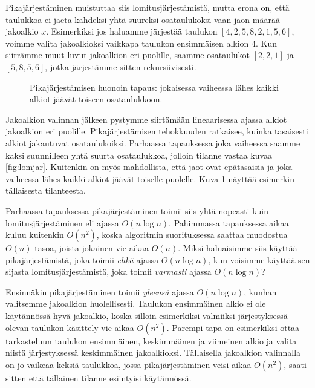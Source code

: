 Pikajärjestäminen muistuttaa siis lomitusjärjestämistä,
mutta erona on, että taulukkoa ei jaeta kahdeksi yhtä suureksi
osataulukoksi vaan jaon määrää jakoalkio $x$.
Esimerkiksi jos haluamme järjestää taulukon $[4,2,5,8,2,1,5,6]$,
voimme valita jakoalkioksi vaikkapa taulukon ensimmäisen alkion $4$.
Kun siirrämme muut luvut jakoalkion eri puolille,
saamme osataulukot $[2,2,1]$ ja $[5,8,5,6]$, jotka järjestämme
sitten rekursiivisesti.

\begin{figure}
\center
{}
\caption{Pikajärjestämisen huonoin tapaus: jokaisessa vaiheessa lähes kaikki
alkiot jäävät toiseen osataulukkoon.}
\label{fig:pikjar}
\end{figure}

Jakoalkion valinnan jälkeen pystymme siirtämään lineaarisessa ajassa
alkiot jakoalkion eri puolille.
Pikajärjestämisen tehokkuuden ratkaisee, kuinka tasaisesti
alkiot jakautuvat osataulukoiksi.
Parhaassa tapauksessa joka vaiheessa saamme kaksi suunnilleen
yhtä suurta osataulukkoa, jolloin tilanne vastaa kuvaa \ref{fig:lomjar}.
Kuitenkin on myös mahdollista, että jaot ovat epätasaisia ja
joka vaiheessa lähes kaikki alkiot jäävät toiselle puolelle.
Kuva \ref{fig:pikjar} näyttää esimerkin tällaisesta tilanteesta.

Parhaassa tapauksessa pikajärjestäminen toimii siis yhtä nopeasti
kuin lomitusjärjestäminen eli ajassa $O(n \log n)$.
Pahimmassa tapauksessa aikaa kuluu kuitenkin $O(n^2)$,
koska algoritmin suorituksessa saattaa muodostua $O(n)$ tasoa,
joista jokainen vie aikaa $O(n)$.
Miksi haluaisimme siis käyttää pikajärjestämistä,
joka toimii \emph{ehkä} ajassa $O(n \log n)$,
kun voisimme käyttää sen sijasta lomitusjärjestämistä,
joka toimii \emph{varmasti} ajassa $O(n \log n)$?

Ensinnäkin pikajärjestäminen toimii \emph{yleensä}
ajassa $O(n \log n)$, kunhan valitsemme jakoalkion huolellisesti.
Taulukon ensimmäinen alkio ei ole käytän\-nössä hyvä jakoalkio,
koska silloin esimerkiksi valmiiksi järjestyksessä olevan
taulukon käsittely vie aikaa $O(n^2)$.
Parempi tapa on esimerkiksi ottaa tarkasteluun taulukon ensimmäinen,
keskimmäinen ja viimeinen alkio ja valita niistä
järjestyksessä keskimmäinen jakoalkioksi.
Tällaisella jakoalkion valinnalla on jo vaikeaa keksiä taulukkoa,
jossa pikajärjestäminen veisi aikaa $O(n^2)$,
saati sitten että tällainen tilanne esiintyisi käytännössä.

